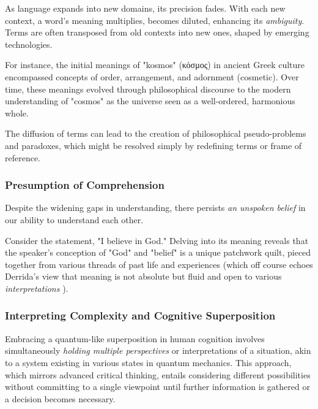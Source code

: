 \documentclass[11pt,a4]{article}
\newcommand{\textgreek}[1]{\begingroup\fontencoding{LGR}\selectfont#1\endgroup}
\begin{document}
        \par
        As language expands into new domains, its precision fades. With each new context, a word's meaning
        multiplies, becomes diluted, enhancing its \textit{ambiguity}. Terms are often transposed from old
        contexts into new ones, shaped by emerging technologies.

        For instance,  the initial meanings of "kosmos" (\textgreek{κόσμος}) in ancient Greek culture
        encompassed concepts of order, arrangement, and adornment (cosmetic). Over time, these meanings
        evolved through philosophical discourse to the modern understanding of "cosmos" as the universe
         seen as a well-ordered, harmonious whole.

        \par
        The diffusion of  terms can lead to the creation of philosophical pseudo-problems and paradoxes,
        which might be resolved simply by redefining terms or frame of reference.
        \par

        \subsubsection{Presumption of Comprehension}
        Despite the widening gaps in understanding, there persists
        \textit{an unspoken belief} in our ability to understand each other.

        Consider the statement, "I believe in God." Delving into its meaning reveals that the speaker's
        conception of "God" and "belief" is a unique patchwork quilt, pieced together from various threads
        of past life and experiences (which off course echoes Derrida's view that meaning is not absolute
        but fluid and open to various \textit{interpretations} \cite{Deconstruction}).


        \subsubsection{Interpreting Complexity and Cognitive Superposition}

        Embracing a quantum-like superposition in human cognition involves
        simultaneously \textit{holding multiple perspectives} or interpretations of a situation, akin to a
        system existing in various states in quantum mechanics. This approach, which mirrors advanced
        critical thinking, entails considering different possibilities without committing to a single
        viewpoint until further information is gathered or a decision becomes necessary.
\end{document}
